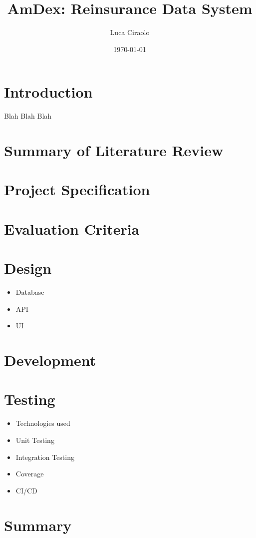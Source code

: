 \documentclass[12pt]{article}
\title{AmDex: Reinsurance Data System}
\author{Luca Ciraolo}
\date{\today}
\begin{document}
\maketitle
\section{Introduction}
Blah Blah Blah
\section{Summary of Literature Review}
\section{Project Specification}
\section{Evaluation Criteria}
\section{Design}
\begin{itemize}
    \item Database
    \item API
    \item UI
\end{itemize}
\section{Development}
\section{Testing}
\begin{itemize}
    \item Technologies used
    \item Unit Testing
    \item Integration Testing
    \item Coverage
    \item CI/CD
\end{itemize}
\section{Summary}
\end{document}
